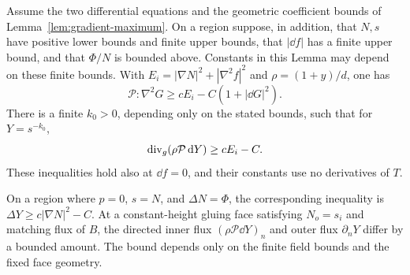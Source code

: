 \begin{lemma}\label{lem:gradient-energy}
Assume the two differential equations and the geometric coefficient
bounds of Lemma~\ref{lem:gradient-maximum}.  On a region suppose, in
addition, that $N,s$ have positive lower bounds and finite upper bounds,
that $|\dd f|$ has a finite upper bound, and that $\Phi/N$ is bounded
above.  Constants in this Lemma may depend on these finite bounds.
With
$E_i=|\nabla N|^2+|\nabla^2f|^2$ and
$\rho=(1+y)/d$, one has
\begin{equation}
 \mathcal P:\nabla^2G\ge cE_i-C(1+|\dd G|^2).
 \label{eq:calculus-energy-nondivergence}
\end{equation}
There is a finite $k_0>0$, depending only on the stated bounds, such
that for $Y=s^{-k_0}$,
\begin{equation}
 \operatorname{div}_g(\rho\mathcal P\mathop{}\!\mathrm d Y)\ge cE_i-C.
 \label{eq:calculus-energy-divergence}
\end{equation}
These inequalities hold also at $\dd f=0$, and their constants use no
derivatives of $T$.

On a region where $p=0$, $s=N$, and $\Delta N=\Phi$, the corresponding
inequality is $\Delta Y\ge c|\nabla N|^2-C$.
At a constant-height gluing face satisfying $N_o=s_i$ and matching
flux of $B$, the directed inner flux $(\rho\mathcal P\dd Y)_n$ and
outer flux $\partial_nY$ differ by a bounded amount.  The bound
depends only on the finite field bounds and the fixed face geometry.
\end{lemma}

